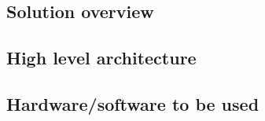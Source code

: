 \documentclass[../main.tex]{subfiles}
\begin{document}
\subsection{Solution overview}

\blindtext

\subsection{High level architecture}

\blindtext

\subsection{Hardware/software to be used}

\blindtext
\end{document}
